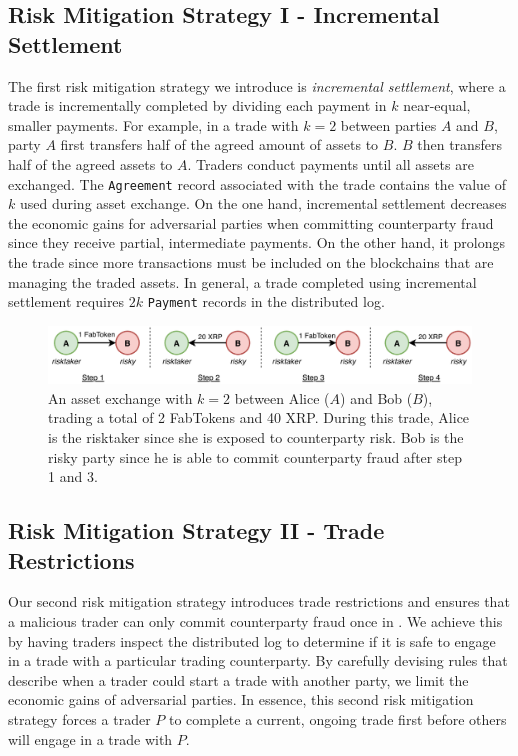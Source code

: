 \subsection{Risk Mitigation Strategy I - Incremental Settlement}
\label{sec:incremental_settlement}
The first risk mitigation strategy we introduce is \emph{incremental settlement}, where a trade is incrementally completed by dividing each payment in $ k $ near-equal, smaller payments.
For example, in a trade with $ k = 2 $ between parties $ A $ and $ B $, party $ A $ first transfers half of the agreed amount of assets to $ B $.
$ B $ then transfers half of the agreed assets to $ A $.
Traders conduct payments until all assets are exchanged.
The \texttt{Agreement} record associated with the trade contains the value of $ k $ used during asset exchange.
On the one hand, incremental settlement decreases the economic gains for adversarial parties when committing counterparty fraud since they receive partial, intermediate payments.
On the other hand, it prolongs the trade since more transactions must be included on the blockchains that are managing the traded assets.
In general, a trade completed using incremental settlement requires $ 2k $ \texttt{Payment} records in the distributed log.

\begin{figure}[t]
	\centering
	\includegraphics[width=\linewidth]{xchange/assets/trade}
	\caption{An asset exchange with $ k = 2 $ between Alice ($ A $) and Bob ($ B $), trading a total of 2 FabTokens and 40 XRP. During this trade, Alice is the risktaker since she is exposed to counterparty risk. Bob is the risky party since he is able to commit counterparty fraud after step 1 and 3.}
	\label{fig:incremental_trade}
\end{figure}

\subsection{Risk Mitigation Strategy II - Trade Restrictions}
\label{sec:limit_risk}
Our second risk mitigation strategy introduces trade restrictions and ensures that a malicious trader can only commit counterparty fraud once in \ModelName{}.
We achieve this by having traders inspect the distributed log to determine if it is safe to engage in a trade with a particular trading counterparty.
By carefully devising rules that describe when a trader could start a trade with another party, we limit the economic gains of adversarial parties.
In essence, this second risk mitigation strategy forces a trader $ P $ to complete a current, ongoing trade first before others will engage in a trade with $ P $.


